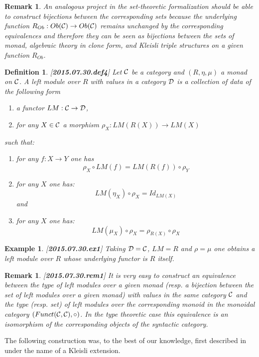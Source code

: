 \documentclass[11pt]{article}
\newtheorem{definition}[proposition]{Definition}
\newtheorem{example}[proposition]{Example}
\newtheorem{remark}[proposition]{Remark}
\newcommand{\llabel}[1]{\label{#1}[{\bf #1}]}
\newcommand{\sr}{\rightarrow}
\begin{document}
{\begin{remark}
An analogous project in the set-theoretic formalization should be able to construct bijections between the corresponding sets because the underlying function $R_{Ob}:Ob({\cal C})\sr Ob({\cal C})$ remains unchanged by the corresponding equivalences and therefore they can be seen as bijections between the sets of monad, algebraic theory in clone form, and Kleisli triple structures on a given function $R_{Ob}$.
\end{remark} 
%

\begin{definition}
\llabel{2015.07.30.def4}
Let $\cal C$ be a category and $(R,\eta,\mu)$ a monad on $\cal C$. A left module over $R$ with values in a category $\cal D$ is a collection of data of the following form
%
\begin{enumerate}
\item a functor $LM:{\cal C}\sr {\cal D}$,
\item for any $X\in {\cal C}$ a morphism $\rho_X:LM(R(X))\sr LM(X)$
\end{enumerate}
%
such that:
%
\begin{enumerate}
%
\item for any $f:X\sr Y$ one has 
%
$$\rho_X\circ LM(f)=LM(R(f))\circ \rho_Y$$
%
\item for any $X$ one has:
%
$$LM(\eta_X)\circ \rho_X=Id_{LM(X)}$$
%
and
\item for any $X$ one has:
%
$$LM(\mu_X)\circ \rho_X=\rho_{R(X)}\circ \rho_X$$
%
\end{enumerate}
\end{definition}
%
\begin{example}\rm
\llabel{2015.07.30.ex1}
Taking ${\cal D}={\cal C}$, $LM=R$ and $\rho=\mu$ one obtains a left module over $R$ whose underlying functor is $R$ itself. 
\end{example}
%
\begin{remark}\rm
\llabel{2015.07.30.rem1}
It is very easy to construct an equivalence between the type of left modules over a given monad (resp. a bijection between the set of left modules over a given monad) with values in the same category $\cal C$ and the type (resp. set) of left modules over the corresponding monoid in the monoidal category $(Funct({\cal C},{\cal C}),\circ)$. In the type theoretic case this equivalence is an isomorphism of the corresponding objects of the syntactic category. 
\end{remark}
%
The following construction was, to the best of our knowledge, first described in \cite[Def. 10, p.550]{HM2010} under the name of a Kleisli extension. 
}
\end{document}
